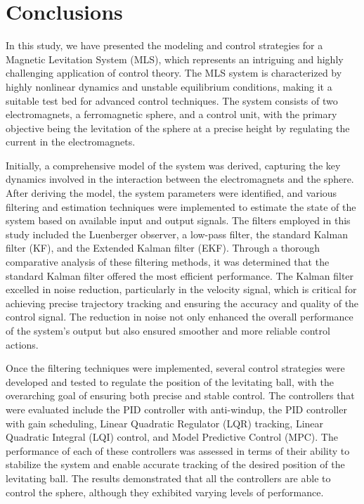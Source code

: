 \section{Conclusions}
\label{sec:conclusions}

In this study, we have presented the modeling and control strategies for a Magnetic Levitation System (MLS), which represents an intriguing and highly challenging application of control theory.
The MLS system is characterized by highly nonlinear dynamics and unstable equilibrium conditions, making it a suitable test bed for advanced control techniques.
The system consists of two electromagnets, a ferromagnetic sphere, and a control unit, with the primary objective being the levitation of the sphere at a precise height by regulating the current in the electromagnets.

Initially, a comprehensive model of the system was derived, capturing the key dynamics involved in the interaction between the electromagnets and the sphere.
After deriving the model, the system parameters were identified, and various filtering and estimation techniques were implemented to estimate the state of the system based on available input and output signals.
The filters employed in this study included the Luenberger observer, a low-pass filter, the standard Kalman filter (KF), and the Extended Kalman filter (EKF).
Through a thorough comparative analysis of these filtering methods, it was determined that the standard Kalman filter offered the most efficient performance.
The Kalman filter excelled in noise reduction, particularly in the velocity signal, which is critical for achieving precise trajectory tracking and ensuring the accuracy and quality of the control signal.
The reduction in noise not only enhanced the overall performance of the system's output but also ensured smoother and more reliable control actions.

Once the filtering techniques were implemented, several control strategies were developed and tested to regulate the position of the levitating ball, with the overarching goal of ensuring both precise and stable control.
The controllers that were evaluated include the PID controller with anti-windup, the PID controller with gain scheduling, Linear Quadratic Regulator (LQR) tracking, Linear Quadratic Integral (LQI) control, and Model Predictive Control (MPC).
The performance of each of these controllers was assessed in terms of their ability to stabilize the system and enable accurate tracking of the desired position of the levitating ball.
The results demonstrated that all the controllers are able to control the sphere, although they exhibited varying levels of performance.

